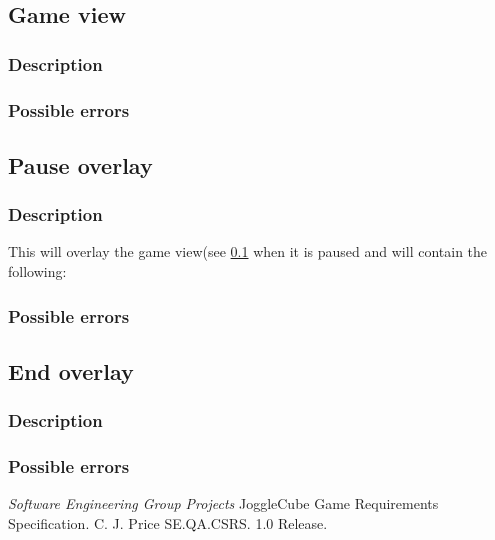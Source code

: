 \documentclass{project}
\begin{document}
\subsection{Game view} \label{Game View}
\subsubsection{Description}
\subsubsection{Possible errors}


\subsection{Pause overlay} \label{Pause Overlay}
\subsubsection{Description}
This will overlay the game view(see \ref{Game View} when it is paused and will contain the following:
\begin{itemize}

\end{itemize}
\subsubsection{Possible errors}

\subsection{End overlay} \label{End Overlay}
\subsubsection{Description}
\subsubsection{Possible errors}


\clearpage
{}
\begin{thebibliography}{5}
 \emph{Software Engineering Group Projects}
JoggleCube Game Requirements Specification.
C. J. Price SE.QA.CSRS. 1.0 Release.
\end{thebibliography}
\clearpage
{}
\end{document}
